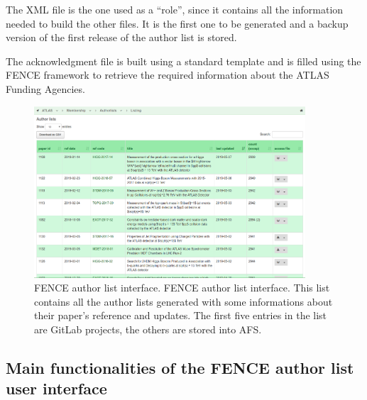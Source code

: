 The XML file is the one used as a \enquote{role}, since it contains all the information needed to build the other files.
It is the first one to be generated and a backup version of the first release of the author list is stored.

The acknowledgment  file is built using a standard template and is filled using the FENCE framework to retrieve the required information about the ATLAS Funding Agencies.

\begin{figure}[htb]
  \centering
  \includegraphics[width=0.9\textwidth]{figures/authorlist_interface.png}%
  \caption{FENCE author list interface.
    FENCE author list interface. This list contains all the author lists generated with some informations about their paper's reference and updates. The first five entries in the list are GitLab projects, the others are stored into AFS.}
  \label{fig:authorlist_interface}
\end{figure}

\subsection{Main functionalities of the FENCE author list user interface}
\label{sec:Main_functionalities_of_the_FENCE_Author_list_user_interface}

